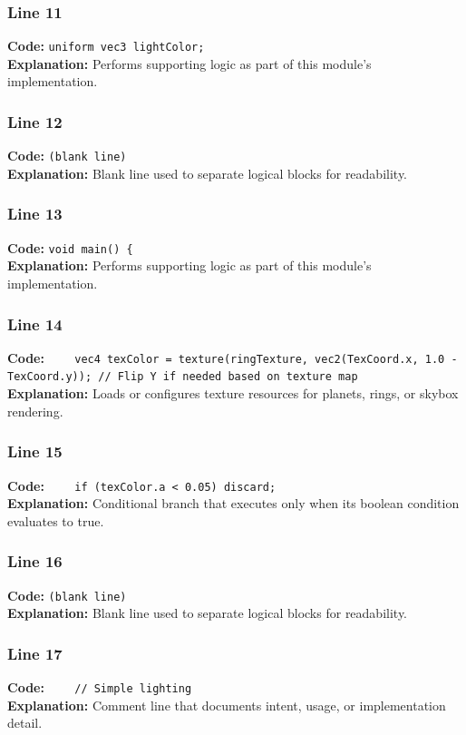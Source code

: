 \documentclass[11pt,a4paper]{article}
\begin{document}
\subsubsection*{Line 11}
\textbf{Code:} \verb|uniform vec3 lightColor;|\\
\textbf{Explanation:} Performs supporting logic as part of this module's implementation.

\subsubsection*{Line 12}
\textbf{Code:} \texttt{(blank line)}\\
\textbf{Explanation:} Blank line used to separate logical blocks for readability.

\subsubsection*{Line 13}
\textbf{Code:} \verb|void main() {|\\
\textbf{Explanation:} Performs supporting logic as part of this module's implementation.

\subsubsection*{Line 14}
\textbf{Code:} \verb|    vec4 texColor = texture(ringTexture, vec2(TexCoord.x, 1.0 - TexCoord.y)); // Flip Y if needed based on texture map|\\
\textbf{Explanation:} Loads or configures texture resources for planets, rings, or skybox rendering.

\subsubsection*{Line 15}
\textbf{Code:} \verb|    if (texColor.a < 0.05) discard;|\\
\textbf{Explanation:} Conditional branch that executes only when its boolean condition evaluates to true.

\subsubsection*{Line 16}
\textbf{Code:} \texttt{(blank line)}\\
\textbf{Explanation:} Blank line used to separate logical blocks for readability.

\subsubsection*{Line 17}
\textbf{Code:} \verb|    // Simple lighting|\\
\textbf{Explanation:} Comment line that documents intent, usage, or implementation detail.
\end{document}
